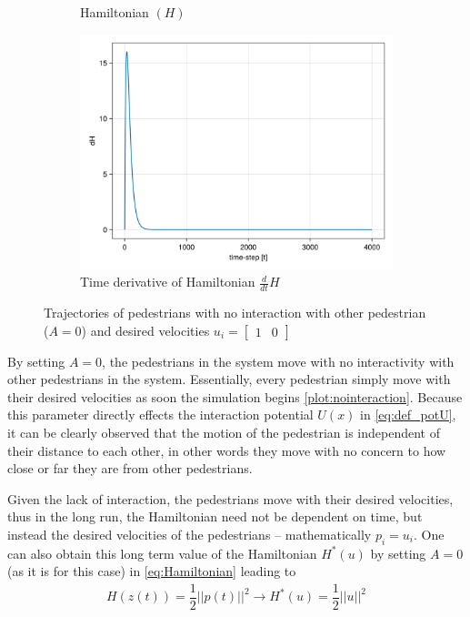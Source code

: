 \begin{itemize}
\begin{figure}[H]
\begin{subfigure}{.40\textwidth}
        \caption{Hamiltonian $(H)$}
        \label{plot:nointeraction_h}
    \end{subfigure}
    \begin{subfigure}{.40\textwidth}
        \centering
        \includegraphics[width=\linewidth]{figures/dH_no_interaction.png}
        \caption{Time derivative of Hamiltonian $\frac{d}{dt}H$}
        \label{plot:nointeraction_dh}
    \end{subfigure}
    \caption{Trajectories of pedestrians with no interaction with other pedestrian ($ A = 0 $) and desired velocities $u_i = \begin{bmatrix}1 & 0\end{bmatrix} $}
    \label{plot:nointeraction}
\end{figure}

By setting $A = 0$, the pedestrians in the system move with no interactivity with other pedestrians in the system. Essentially, every pedestrian simply move with their desired velocities as soon the simulation begins \autoref{plot:nointeraction}. Because this parameter directly effects the interaction potential $U(x)$ in \autoref{eq:def_potU}, it can be clearly observed that the motion of the pedestrian is independent of their distance to each other, in other words they move with no concern to how close or far they are from other pedestrians.

Given the lack of interaction, the pedestrians move with their desired velocities, thus in the long run, the Hamiltonian need not be dependent on time, but instead the desired velocities of the pedestrians -- mathematically $p_i = u_i$. One can also obtain this long term value of the Hamiltonian $H^*(u)$ by setting $A = 0$ (as it is for this case) in \autoref{eq:Hamiltonian} leading to 
\begin{align}
    H(z(t)) = \dfrac{1}{2}||p(t)||^2 \rightarrow H^*(u) = \dfrac{1}{2}||u||^2
    \label{eq:Hstar}
\end{align}


\end{itemize}
